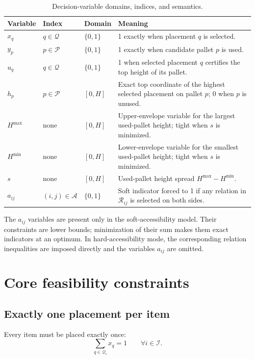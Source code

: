 \documentclass[11pt]{article}
\newcommand{\Item}{\mathcal{I}}
\newcommand{\Pallet}{\mathcal{P}}
\newcommand{\Place}{\mathcal{Q}}
\begin{document}
\begin{table}[ht]
\centering
\small
\begin{tabularx}{\linewidth}{@{}lllX@{}}
\toprule
Variable & Index & Domain & Meaning \\
\midrule
$x_q$ & $q\in\Place$ & $\{0,1\}$ & 1 exactly when placement $q$ is selected. \\
$y_p$ & $p\in\Pallet$ & $\{0,1\}$ & 1 exactly when candidate pallet $p$ is used. \\
$u_q$ & $q\in\Place$ & $\{0,1\}$ & 1 when selected placement $q$ certifies the top height of its pallet. \\
$h_p$ & $p\in\Pallet$ & $[0,H]$ & Exact top coordinate of the highest selected placement on pallet $p$; 0 when $p$ is unused. \\
$H^{\max}$ & none & $[0,H]$ & Upper-envelope variable for the largest used-pallet height; tight when $s$ is minimized. \\
$H^{\min}$ & none & $[0,H]$ & Lower-envelope variable for the smallest used-pallet height; tight when $s$ is minimized. \\
$s$ & none & $[0,H]$ & Used-pallet height spread $H^{\max}-H^{\min}$. \\
$a_{ij}$ & $(i,j)\in\mathcal A$ & $\{0,1\}$ & Soft indicator forced to 1 if any relation in $\mathcal R_{ij}$ is selected on both sides. \\
\bottomrule
\end{tabularx}
\caption{Decision-variable domains, indices, and semantics.}
\label{tab:variables}
\end{table}

The $a_{ij}$ variables are present only in the soft-accessibility model.  Their
constraints are lower bounds; minimization of their sum makes them exact
indicators at an optimum.  In hard-accessibility mode, the corresponding
relation inequalities are imposed directly and the variables $a_{ij}$ are
omitted.

\section{Core feasibility constraints}

\subsection{Exactly one placement per item}

Every item must be placed exactly once:
\begin{equation}
  \sum_{q\in\Place_i}x_q = 1
  \qquad \forall i\in\Item.
  \label{eq:place-once}
\end{equation}
\end{document}
